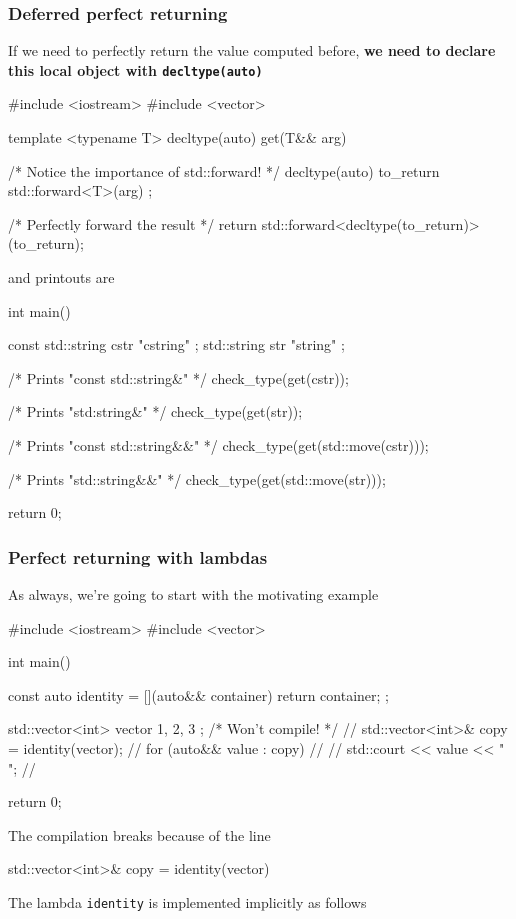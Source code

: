 \documentclass[../main]{subfiles}
\begin{document}
\subsubsection{Deferred perfect returning}
    If we need to perfectly return the value computed before,
\textbf{we need to declare this local object with \texttt{decltype(auto)}}
\begin{Code}
    #include <iostream>
    #include <vector>
    
    template <typename T>
    decltype(auto) get(T&& arg)
    {
        /* Notice the importance of std::forward! */
        decltype(auto) to_return { std::forward<T>(arg) };
        
        /* Perfectly forward the result */
        return std::forward<decltype(to_return)>(to_return);
    }
\end{Code}
\noindent
and printouts are
\begin{Code}
    int main()
    {
        const std::string cstr { "cstring" };
        std::string str { "string" };

        /* Prints "const std::string&" */
        check_type(get(cstr));

        /* Prints "std:string&" */
        check_type(get(str));

        /* Prints "const std::string&&" */
        check_type(get(std::move(cstr)));

        /* Prints "std::string&&" */
        check_type(get(std::move(str)));
    
        return 0;
    }
\end{Code}

\subsubsection{Perfect returning with lambdas}
    As always, we're going to start with the motivating example
\begin{Code}
    #include <iostream>
    #include <vector>
    
    int main()
    {
        const auto identity = [](auto&& container)
        {
            return container;
        };
        
        std::vector<int> vector { 1, 2, 3 };
        /* Won't compile! */
        //  std::vector<int>& copy = identity(vector);
        // for (auto&& value : copy)
        // {
        //      std::court << value << " ";
        // }
        
        return 0;
    }
\end{Code}
\noindent
The compilation breaks because of the line
\begin{Code}
    std::vector<int>& copy = identity(vector)
\end{Code}
The lambda \texttt{identity} is implemented implicitly as follows
\end{document}
